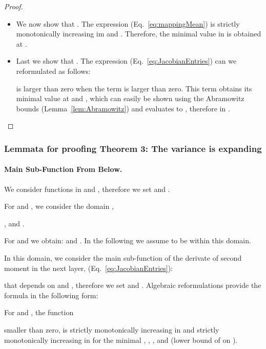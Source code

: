 \documentclass{article}
\begin{document}
\begin{proof}
\begin{itemize}
\item We now show that . The expression
 (Eq.~\eqref{eq:mappingMean})
is strictly monotonically increasing im  and . Therefore,
the minimal value in  is obtained at 
. 

\item Last we show that .
The expression
 (Eq.~\eqref{eq:JacobianEntries})
can we reformulated as follows:


is larger than zero when the term 
is larger than zero. This term obtains its minimal value 
at  and , which can easily be shown using the 
Abramowitz bounds (Lemma~\ref{lem:Abramowitz})
and evaluates to , therefore  in .

\end{itemize}
\end{proof}







\subsubsection{Lemmata for proofing Theorem 3: The variance is expanding}




\paragraph{Main Sub-Function From Below.}

We consider functions in
 and , therefore we 
set   and .

For  and 
,
we consider the domain
, 
 
, and 
.

For  and  we obtain:  and 
.
In the following we assume to be within this domain.

In this domain, we consider the main sub-function of the derivate of second moment in the next layer,  (Eq.~\eqref{eq:JacobianEntries}):


that depends on  and , therefore we 
set   and . Algebraic reformulations provide the 
formula in the following form:




\begin{lemma}
\label{lem:subfunction1}

For  and , 
the function

smaller than zero, is strictly monotonically increasing in 
and strictly monotonically increasing in  for the minimal ,
, , and  (lower
bound of  on ).
\end{lemma}
\end{document}
